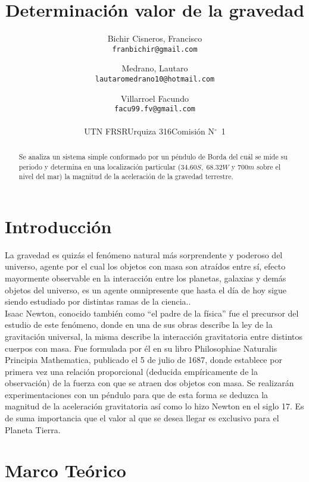 \documentclass[a4paper,twocolumn]{article}
\title{Determinación valor de la gravedad}%
\author{Bichir Cisneros, Francisco\\
\texttt{franbichir@gmail.com}
\and
Medrano, Lautaro\\
\texttt{lautaromedrano10@hotmail.com}\\
\and
Villarroel Facundo\\
\texttt{facu99.fv@gmail.com}
\\
\\
UTN FRSR\textendash{}Urquiza 316\textendash{}Comisión N$^\circ$~1}
\begin{document}
\maketitle

\begin{abstract}
    Se analiza un sistema simple conformado por un péndulo de Borda\cite{b1} del cuál se mide su periodo\cite{b2} y determina en una localización particular ($34.60 S,\;68.32W$ y $700m$ sobre el nivel del mar) la magnitud de la aceleración de la gravedad terrestre.
\end{abstract}

\section{Introducción}

La gravedad es quizás el fenómeno natural más sorprendente y poderoso del universo\cite{b3}, agente por el cual  los objetos con masa son atraídos entre sí, efecto mayormente observable en la interacción entre los planetas, galaxias y demás objetos del universo, es un agente omnipresente que hasta el día de hoy sigue siendo estudiado por distintas ramas de la ciencia.\cite{b4}.\\

Isaac Newton\cite{b5}, conocido también como “el padre de la física” fue el precursor del estudio de este fenómeno, donde en una de sus obras describe la ley de la gravitación universal\cite{b6}, la misma describe la interacción gravitatoria entre distintos cuerpos con masa. Fue formulada por él en su libro Philosophiae Naturalis Principia Mathematica\cite{b6}, publicado el 5 de julio de 1687, donde establece por primera vez una relación proporcional (deducida empíricamente de la observación) de la fuerza con que se atraen dos objetos con masa.
Se realizarán experimentaciones con un péndulo para que de esta forma se deduzca la magnitud de la aceleración gravitatoria así como lo hizo Newton en el siglo 17. Es de suma importancia que el valor al que se desea llegar es exclusivo para el Planeta Tierra.\cite{b7}


\section{Marco Teórico}
\end{document}

